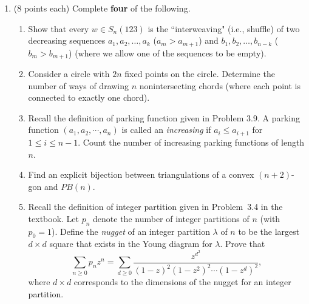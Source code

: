 \documentclass[11pt]{article}
\theoremstyle{definition}
\DeclareMathOperator{\NC}{NC}
\begin{document}
\begin{enumerate}
	
\item (8 points each) Complete \textbf{four} of the following.
\begin{enumerate}
\item Show that every $w\in S_n(123)$ is the ``interweaving" (i.e., shuffle) of two decreasing sequences $a_1,a_2,\ldots, a_k$ ($a_m>a_{m+1}$) and $b_1,b_2,\ldots,b_{n-k}$ ($b_m>b_{m+1}$) (where we allow one of the sequences to be empty).  %
\item Consider a circle with $2n$ fixed points on the circle.  Determine the number of ways of drawing $n$ nonintersecting chords (where each point is connected to exactly one chord).
\item Recall the definition of parking function given in Problem 3.9.  A parking function $(a_1,a_2,\cdots,a_n)$ is called an \emph{increasing} if $a_i\leq a_{i+1}$ for $1\leq i\leq n-1$. Count the number of increasing parking functions of length $n$.


\item Find an explicit bijection between triangulations of a convex $(n+2)$-gon and $PB(n)$.

\item Recall the definition of integer partition given in Problem~3.4 in the textbook. Let $p_n$ denote the number of integer partitions of $n$ (with $p_0=1$). Define the \emph{nugget} of an integer partition $\lambda$ of $n$ to be the largest $d\times d$ square that exists in the Young diagram for $\lambda$. Prove that
\[
\sum_{n\geq 0}p_nz^n = \sum_{d\geq 0}\frac{z^{d^2}}{(1-z)^2(1-z^2)^2\cdots (1-z^d)^2},
\]
where $d\times d$ corresponds to the dimensions of the nugget for an integer partition.


\end{enumerate}
\end{enumerate}
\end{document}
